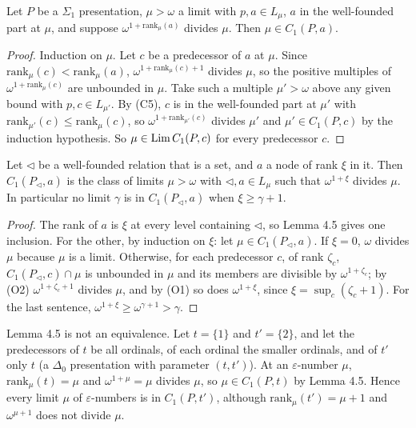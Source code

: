 \documentclass[11pt]{article}
\begin{document}
\begin{statement} Let $P$ be a $\Sigma_1$ presentation, $\mu > \omega$ a limit with $p, a \in L_\mu$,
$a$ in the well-founded part at $\mu$, and suppose $\omega^{1+\mathrm{rank}_\mu(a)}$ divides $\mu$. Then $\mu \in
C_1(P, a)$.
\end{statement}

\begin{proof}
Induction on $\mu$. Let $c$ be a predecessor of $a$ at $\mu$. Since $\mathrm{rank}_\mu(c) < \mathrm{rank}_\mu(a)$,
$\omega^{1+\mathrm{rank}_\mu(c)+1}$ divides $\mu$, so the positive multiples of $\omega^{1+\mathrm{rank}_\mu(c)}$ are
unbounded in $\mu$. Take such a multiple $\mu' > \omega$ above any given bound with $p, c \in L_{\mu'}$. By (C5), $c$
is in the well-founded part at $\mu'$ with $\mathrm{rank}_{\mu'}(c) \le \mathrm{rank}_\mu(c)$, so
$\omega^{1+\mathrm{rank}_{\mu'}(c)}$ divides $\mu'$ and $\mu' \in C_1(P,c)$ by the induction hypothesis. So $\mu \in
\mathrm{Lim}\, C_1(P,c)$ for every predecessor $c$.
\end{proof}

\begin{statement} Let $\lhd$ be a well-founded relation that is a set, and $a$ a node of rank
$\xi$ in it. Then $C_1(P_\lhd, a)$ is the class of limits $\mu > \omega$ with $\lhd, a \in L_\mu$ such that
$\omega^{1+\xi}$ divides $\mu$. In particular no limit $\gamma$ is in $C_1(P_\lhd,a)$ when $\xi \ge \gamma + 1$.
\end{statement}

\begin{proof}
The rank of $a$ is $\xi$ at every level containing $\lhd$, so Lemma 4.5 gives one inclusion. For the other, by
induction on $\xi$: let $\mu \in C_1(P_\lhd,a)$. If $\xi = 0$, $\omega$ divides $\mu$ because $\mu$ is a limit.
Otherwise, for each predecessor $c$, of rank $\zeta_c$, $C_1(P_\lhd,c) \cap \mu$ is unbounded in $\mu$ and its members
are divisible by $\omega^{1+\zeta_c}$; by (O2) $\omega^{1+\zeta_c+1}$ divides $\mu$, and by (O1) so does
$\omega^{1+\xi}$, since $\xi = \sup_c(\zeta_c + 1)$. For the last sentence, $\omega^{1+\xi} \ge \omega^{\gamma+1} >
\gamma$.
\end{proof}

\begin{statement} Lemma 4.5 is not an equivalence. Let $t = \{1\}$ and $t' = \{2\}$, and let the
predecessors of $t$ be all ordinals, of each ordinal the smaller ordinals, and of $t'$ only $t$ (a $\Delta_0$
presentation with parameter $(t, t')$). At an $\varepsilon$-number $\mu$, $\mathrm{rank}_\mu(t) = \mu$ and
$\omega^{1+\mu} = \mu$ divides $\mu$, so $\mu \in C_1(P, t)$ by Lemma 4.5. Hence every limit $\mu$ of
$\varepsilon$-numbers is in $C_1(P, t')$, although $\mathrm{rank}_\mu(t') = \mu + 1$ and $\omega^{\mu+1}$ does not
divide $\mu$.
\end{statement}
\end{document}
